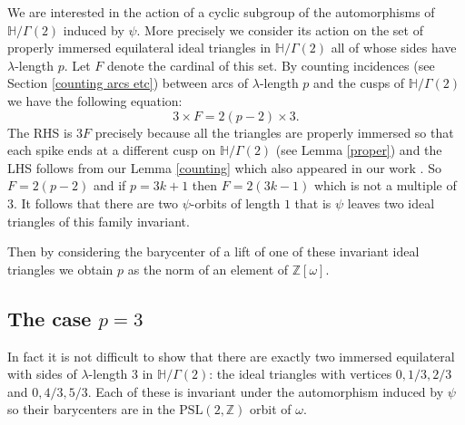 \documentclass[12pt]{amsart}
\theoremstyle{plain}
\theoremstyle{definition}
\def\HH{\mathbb{H}}
\def\xx{\HH/g2}
\def\ZZ{\mathbb{Z}}
\def\sl2{\mathrm{PSL}(2, \ZZ)}
\def\g2{\Gamma(2)}
\def\xx{\HH/\g2}
\begin{document}
We are interested in the action of a cyclic subgroup of the 
automorphisms of $\xx$ induced by $\psi$.
More precisely we consider its action on the
set of properly immersed equilateral ideal triangles in $\xx$
all of whose sides have $\lambda$-length $p$.
Let $F$ denote the cardinal of this set.
By counting incidences  (see Section \ref{counting arcs etc}) between  
arcs of $\lambda$-length $p$
and the cusps of $\xx$
we  have the following equation:
\begin{equation} \label{incidence}
3 \times F = 2 (p-2) \times 3.
\end{equation}
The RHS is $3F$ precisely because all the  triangles
are properly immersed so that each spike ends at a
different cusp on $\xx$ (see Lemma \ref{proper})
and the LHS follows from our Lemma \ref{counting}
which also  appeared in our work \cite{vlad}.
So $F = 2(p-2)$ and  if $p= 3k + 1$ then $F = 2(3k -1)$
which is not a multiple of $3$.
It follows that there are two $\psi$-orbits of length $1$
that is $\psi$ leaves two ideal triangles of this family invariant.


Then  by considering the barycenter
of a lift of one of these invariant ideal triangles
we obtain $p$ as the norm of an element of $\ZZ[\omega]$.

\subsection{The case $p=3$}


In fact it is not difficult to show that there
are exactly two immersed equilateral 
with sides of  $\lambda$-length $3$ in $\xx$:
the  ideal triangles with vertices $0,1/3,2/3$ 
and   $0,4/3,5/3$.
Each of these is invariant under the 
automorphism induced by $\psi$
so their barycenters are in the $\sl2$ orbit 
of $\omega$.
\end{document}
